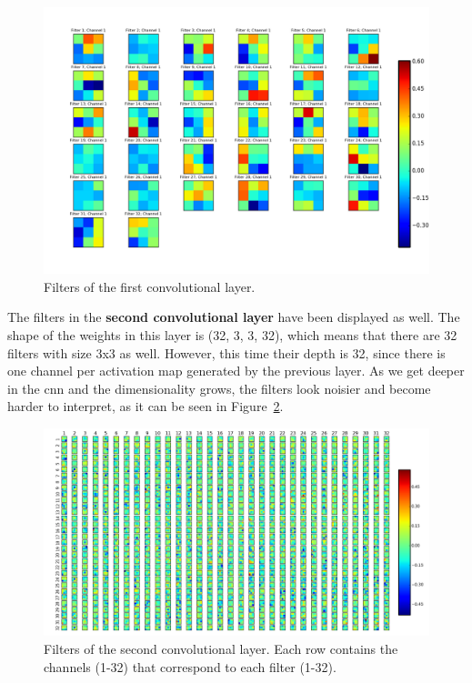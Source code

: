 \begin{figure}
	\centering
	\includegraphics[width=1\linewidth, keepaspectratio]{figures/weights_conv2d_1.png}
	\caption{Filters of the first convolutional layer.}
	\label{fig:filters}
\end{figure}

The filters in the \textbf{second convolutional layer} have been displayed as well. The shape of the weights in this layer is (32, 3, 3, 32), which means that there are 32 filters with size 3x3 as well. However, this time their depth is 32, since there is one channel per activation map generated by the previous layer. As we get deeper in the \gls{cnn} and the dimensionality grows, the filters look noisier and become harder to interpret, as it can be seen in Figure~\ref{fig:filters2}.
\begin{figure}
	\centering
	\includegraphics[width=1\linewidth, keepaspectratio]{figures/weights_conv2d_2.png}
	\caption[Filters of the second convolutional layer.]{Filters of the second convolutional layer. Each row contains the channels (1-32) that correspond to each filter (1-32).}
	\label{fig:filters2}
\end{figure}

